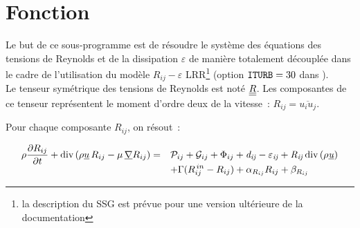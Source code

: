
%
%
%
%


\label{ap:turrij}

\hypertarget{turrij}{}

\vspace{1cm}
\section*{Fonction}
Le but de ce sous-programme est de résoudre le système des équations des
tensions de Reynolds et de la dissipation $\varepsilon$ de manière totalement découplée dans le cadre de l'utilisation du modèle $R_{ij}-\varepsilon$  LRR\footnote{la description du SSG est prévue pour une version ultérieure de la documentation} (option $\text{\texttt{ITURB}}=30$ dans ).\\
Le tenseur symétrique des tensions de Reynolds est noté $\underline{\underline{R}}$. Les composantes de ce tenseur représentent le moment d'ordre deux de la vitesse~: $R_{ij} = \overline{u_iu_j}$.

Pour chaque composante $R_{ij}$, on résout~:

\begin{equation}
\begin{array}{ll}
\displaystyle
\rho\frac{\partial R_{ij}}{\partial t} +
\text{div}\,(\rho \underline{u}\,R_{ij} - \mu\,\underline{\nabla}{R_{ij}}) = &
\mathcal{P}_{ij} + \mathcal{G}_{ij}+\Phi_{ij} + \it{d}_{ij} - \varepsilon_{ij} +
R_{ij}\,\text{div}\,{(\rho \underline{u})} \\
& \displaystyle + \Gamma(R^{\,in}_{ij}-R_{ij}) + \alpha_{R_{ij}} R_{ij} + \beta_{R_{ij}}
\end{array}
\end{equation}

